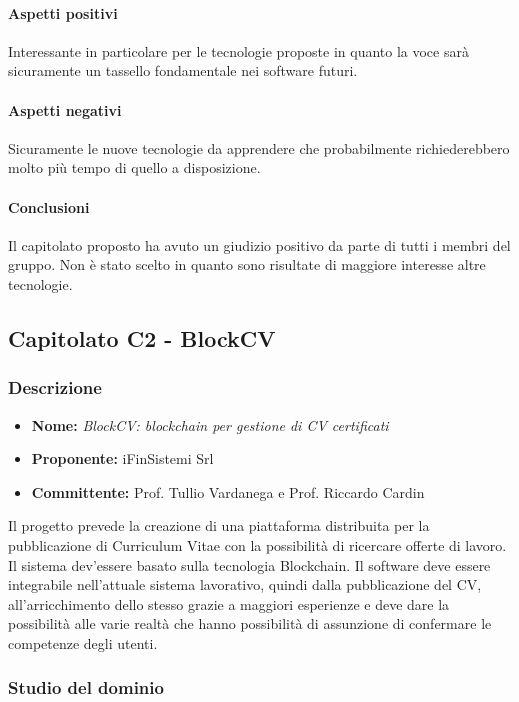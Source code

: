 			\paragraph{Aspetti positivi} \Spazio
			Interessante in particolare per le tecnologie proposte in quanto la voce sarà sicuramente un tassello fondamentale nei software futuri.
			\paragraph{Aspetti negativi} \Spazio
			Sicuramente le nuove tecnologie da apprendere che probabilmente richiederebbero molto più tempo di quello a disposizione. 
			\paragraph{Conclusioni} \Spazio
			Il capitolato proposto ha avuto un giudizio positivo da parte di tutti i membri del gruppo. Non è stato scelto in quanto sono risultate di maggiore interesse altre tecnologie.
			
	\subsection{Capitolato C2 - BlockCV}
	\subsubsection{Descrizione}
	\begin{itemize}
		\item \textbf{Nome:} \emph{BlockCV: blockchain per gestione di CV certificati}
		\item \textbf{Proponente:} iFinSistemi Srl
		\item \textbf{Committente:} Prof. Tullio Vardanega e Prof. Riccardo Cardin
	\end{itemize}
	Il progetto prevede la creazione di una piattaforma distribuita per la pubblicazione di Curriculum Vitae con la possibilità di ricercare offerte di lavoro. Il sistema dev'essere basato sulla tecnologia Blockchain.
	Il software deve essere integrabile nell'attuale sistema lavorativo, quindi dalla pubblicazione del CV, all'arricchimento dello stesso grazie a maggiori esperienze e deve dare la possibilità alle varie realtà che hanno possibilità di assunzione di confermare le competenze degli utenti.    
	\subsubsection{Studio del dominio}
